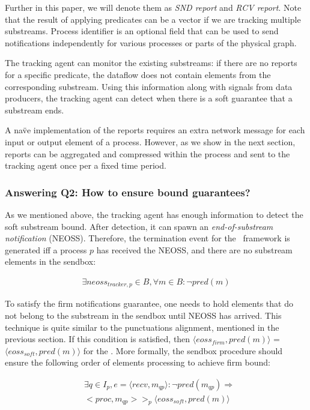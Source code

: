 Further in this paper, we will denote them as {\em SND report} and {\em RCV report}. Note that the result of applying predicates can be a vector if we are tracking multiple substreams. Process identifier is an optional field that can be used to send notifications independently for various processes or parts of the physical graph.

The tracking agent can monitor the existing substreams: if there are no reports for a specific predicate, the dataflow does not contain elements from the corresponding substream. Using this information along with signals from data producers, the tracking agent can detect when there is a soft guarantee that a substream ends.

A na\"ve implementation of the reports requires an extra network message for each input or output element of a process. However, as we show in the next section, reports can be aggregated and compressed within the process and sent to the tracking agent once per a fixed time period.

\subsubsection{Answering Q2: How to ensure bound guarantees?}

As we mentioned above, the tracking agent has enough information to detect the soft substream bound. After detection, it can spawn an {\em end-of-substream notification} (NEOSS). Therefore, the termination event for the \tracker\ framework is generated iff a process $p$ has received the NEOSS, and there are no substream elements in the sendbox:

\begin{align*}
\exists neoss_{tracker,p} \in B, \forall m\in B : \neg pred(m)
\end{align*}

To satisfy the firm notifications guarantee, one needs to hold elements that do not belong to the substream in the sendbox until NEOSS has arrived. This technique is quite similar to the punctuations alignment, mentioned in the previous section. If this condition is satisfied, then $\langle eoss_{firm}, pred(m)\rangle$ = $\langle eoss_{soft}, pred(m)\rangle$ for the \tracker. More formally, the sendbox procedure should ensure the following order of elements processing to achieve firm bound:

\begin{align*}
& \exists q \in I_p, e = \langle recv,m_{qp} \rangle : \neg pred(m_{qp}) \Longrightarrow \\ 
& <proc, m_{qp}> >_p \langle eoss_{soft}, pred(m)\rangle
\end{align*} 

